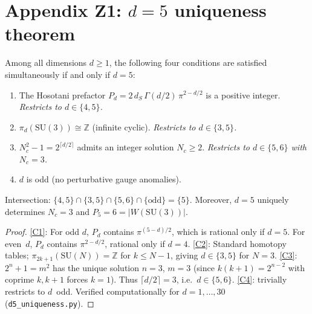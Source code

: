 
\section{Appendix Z1: $d=5$ uniqueness theorem}
\label{app:d5}

\begin{theorem}[$d=5$ uniqueness, Tier~1]\label{thm:d5unique}
Among all dimensions $d\geq 1$, the following four conditions are
satisfied simultaneously if and only if $d=5$:
\begin{enumerate}[label=\upshape(C\arabic*)]
\item\label{C1} The Hosotani prefactor $P_d=2\,d_S\,\Gamma(d/2)\,\pi^{2-d/2}$
  is a positive integer. \emph{Restricts to $d\in\{4,5\}$.}
\item\label{C2} $\pi_d(\mathrm{SU}(3))\cong\mathbb{Z}$ (infinite cyclic).
  \emph{Restricts to $d\in\{3,5\}$.}
\item\label{C3} $N_c^2-1=2^{\lceil d/2\rceil}$ admits an integer solution
  $N_c\geq 2$. \emph{Restricts to $d\in\{5,6\}$ with $N_c=3$.}
\item\label{C4} $d$ is odd (no perturbative gauge anomalies).
\end{enumerate}
Intersection: $\{4,5\}\cap\{3,5\}\cap\{5,6\}\cap\{\text{odd}\}=\{5\}$.
Moreover, $d=5$ uniquely determines $N_c=3$ and $P_5=6=|W(\mathrm{SU}(3))|$.
\end{theorem}

\begin{proof}
\ref{C1}: For odd $d$, $P_d$ contains $\pi^{(5-d)/2}$, which is rational
only if $d=5$. For even~$d$, $P_d$ contains $\pi^{2-d/2}$, rational only
if $d=4$. \ref{C2}: Standard homotopy tables; $\pi_{2k+1}(\mathrm{SU}(N))=\mathbb{Z}$
for $k\leq N-1$, giving $d\in\{3,5\}$ for $N=3$.
\ref{C3}: $2^n+1=m^2$ has the unique solution $n=3$, $m=3$ (since
$k(k+1)=2^{n-2}$ with coprime $k,k+1$ forces $k=1$).
Thus $\lceil d/2\rceil=3$, i.e.\ $d\in\{5,6\}$.
\ref{C4}: trivially restricts to $d$~odd.
Verified computationally for $d=1,\ldots,30$ (\texttt{d5\_uniqueness.py}).
\end{proof}

